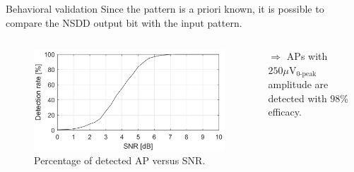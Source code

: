 \documentclass{beamer}
\begin{document}
\begin{frame}{Behavioral validation}
Since the pattern is a priori known, it is possible to \alert{compare} the NSDD output bit with the input pattern.

    \begin{columns}
        \begin{column}{0.6\textwidth}
\begin{figure}
             \includegraphics[width=\textwidth]{images_Alice/percent_value.png}
                \caption{Percentage of detected AP versus SNR.}
                \label{fig:behavioral_setup}
            \end{figure}
        \end{column}
        \hspace{-0.2cm}
        \begin{column}{0.4\textwidth}
        
        
        $\Rightarrow$ APs with $250 \mu \text{V}_{\text{0-peak}}$ amplitude are detected with $98\%$ efficacy.
        \vspace{1cm}
\end{column}
\end{columns}
\end{frame}
\end{document}
